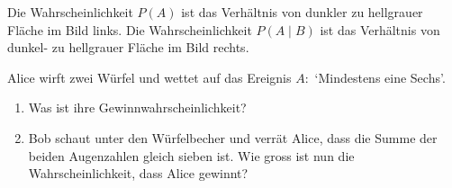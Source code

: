 \begin{center}
\end{center}

Die Wahrscheinlichkeit \(P(A)\) ist das Verhältnis von dunkler zu hellgrauer Fläche im Bild links. Die Wahrscheinlichkeit \(P(A\mid B)\) ist das Verhältnis von dunkel- zu hellgrauer Fläche im Bild rechts.

\begin{bsp}
  {}{}
  Alice wirft zwei Würfel und wettet auf das Ereignis \(A:\) `Mindestens eine Sechs'.
  \begin{enumerate}
    \item Was ist ihre Gewinnwahrscheinlichkeit?
    \item Bob schaut unter den Würfelbecher und verrät Alice, dass die Summe der beiden Augenzahlen gleich sieben ist. Wie gross ist nun die Wahrscheinlichkeit, dass Alice gewinnt?
  \end{enumerate}
  \vspace*{6cm}
\end{bsp}



